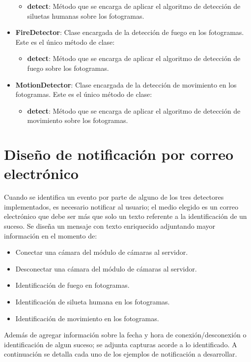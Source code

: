 \begin{itemize}
        \begin{itemize}
            \item \textbf{detect}: Método que se encarga de aplicar el algoritmo de detección de siluetas humanas sobre los fotogramas.
        \end{itemize}
    \item \textbf{FireDetector}: Clase encargada de la detección de fuego en los fotogramas. Este es el único método de clase:
        \begin{itemize}
            \item \textbf{detect}: Método que se encarga de aplicar el algoritmo de detección de fuego sobre los fotogramas.
        \end{itemize}
    \item \textbf{MotionDetector}: Clase encargada de la detección de movimiento en los fotogramas. Este es el único método de clase:
        \begin{itemize}
            \item \textbf{detect}: Método que se encarga de aplicar el algoritmo de detección de movimiento sobre los fotogramas.
        \end{itemize}
\end{itemize}

\section{Diseño de notificación por correo electrónico}
Cuando se identifica un evento por parte de alguno de los tres detectores implementados, es necesario notificar al usuario; el medio elegido es un correo electrónico que debe ser más que solo un texto referente a la identificación de un suceso. Se diseña un mensaje con texto enriquecido adjuntando mayor información en el momento de:
\begin{itemize}
    \item Conectar una cámara del módulo de cámaras al servidor.
    \item Desconectar una cámara del módulo de cámaras al servidor.
    \item Identificación de fuego en fotogramas.
    \item Identificación de silueta humana en los fotogramas.
    \item Identificación de movimiento en los fotogramas.
\end{itemize}
Además de agregar información sobre la fecha y hora de conexión/desconexión o identificación de algun suceso; se adjunta capturas acorde a lo identificado. A continuación se detalla cada uno de los ejemplos de notificación a desarrollar.

